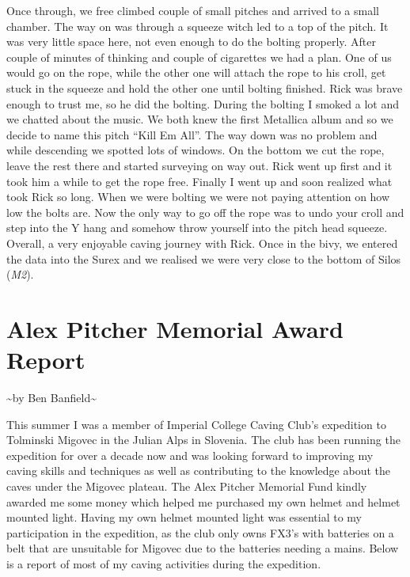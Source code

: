 Once through, we free climbed couple of small pitches and arrived to a
small chamber. The way on was through a squeeze witch led to a top of
the pitch. It was very little space here, not even enough to do the
bolting properly. After couple of minutes of thinking and couple of
cigarettes we had a plan. One of us would go on the rope, while the
other one will attach the rope to his croll, get stuck in the squeeze
and hold the other one until bolting finished. Rick was brave enough to
trust me, so he did the bolting. During the bolting I smoked a lot and
we chatted about the music. We both knew the first Metallica album and
so we decide to name this pitch ``Kill Em All''. The way down was no
problem and while descending we spotted lots of windows. On the bottom
we cut the rope, leave the rest there and started surveying on way out.
Rick went up first and it took him a while to get the rope free. Finally
I went up and soon realized what took Rick so long. When we were bolting
we were not paying attention on how low the bolts are. Now the only way
to go off the rope was to undo your croll and step into the Y hang and
somehow throw yourself into the pitch head squeeze. Overall, a very
enjoyable caving journey with Rick. Once in the bivy, we entered the
data into the Surex and we realised we were very close to the bottom of
Silos (\emph{M2}).

\attrib{\izi}

\hypertarget{alex-pitcher-memorial-award-report}{%
\section{Alex Pitcher Memorial Award
Report}\label{alex-pitcher-memorial-award-report}}

\textasciitilde{}by Ben Banfield\textasciitilde{}

This summer I was a member of Imperial College Caving Club's expedition
to Tolminski Migovec in the Julian Alps in Slovenia. The club has been
running the expedition for over a decade now and was looking forward to
improving my caving skills and techniques as well as contributing to the
knowledge about the caves under the Migovec plateau. The Alex Pitcher
Memorial Fund kindly awarded me some money which helped me purchased my
own helmet and helmet mounted light. Having my own helmet mounted light
was essential to my participation in the expedition, as the club only
owns FX3's with batteries on a belt that are unsuitable for Migovec due
to the batteries needing a mains. Below is a report of most of my caving
activities during the expedition.

